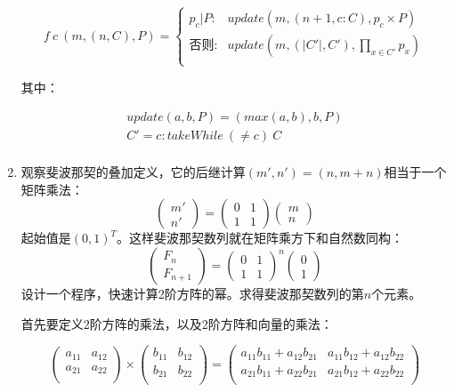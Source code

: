 \documentclass[UTF8]{article}
\begin{document}
\begin{enumerate}
\[
f\ c\ (m, (n, C), P) = \begin{cases}
  p_c | P : & update(m, (n + 1, c : C), p_c \times P) \\
  \text{否则}: & update(m, (|C'|, C'), \displaystyle \prod_{x \in C'} p_x) \\
\end{cases}
\]

其中：

\[ \begin{array}{l}
update(a, b, P) = (max(a, b), b, P) \\
C' = c : takeWhile\ (\neq c)\ C \\
\end{array} \]

\item 观察斐波那契的叠加定义，它的后继计算$(m', n') = (n, m + n)$相当于一个矩阵乘法：
\[
\begin{pmatrix} m' \\ n' \end{pmatrix} =
\begin{pmatrix} 0 & 1 \\ 1 & 1 \end{pmatrix}
\begin{pmatrix} m \\ n \end{pmatrix}
\]
起始值是$(0, 1)^T$。这样斐波那契数列就在矩阵乘方下和自然数同构：
\[
\begin{pmatrix}F_n \\ F_{n+1} \end{pmatrix} = \begin{pmatrix} 0 & 1 \\ 1 & 1 \end{pmatrix}^n\begin{pmatrix} 0 \\ 1 \end{pmatrix}
\]
设计一个程序，快速计算2阶方阵的幂。求得斐波那契数列的第$n$个元素。

首先要定义2阶方阵的乘法，以及2阶方阵和向量的乘法：

\[
\begin{pmatrix}
a_{11} & a_{12} \\
a_{21} & a_{22} \\
\end{pmatrix}
\times
\begin{pmatrix}
b_{11} & b_{12} \\
b_{21} & b_{22} \\
\end{pmatrix}
=
\begin{pmatrix}
a_{11} b_{11} + a_{12} b_{21} & a_{11} b_{12} + a_{12} b_{22} \\
a_{21} b_{11} + a_{22} b_{21} & a_{21} b_{12} + a_{22} b_{22} \\
\end{pmatrix}
\]


\end{enumerate}
\end{document}
